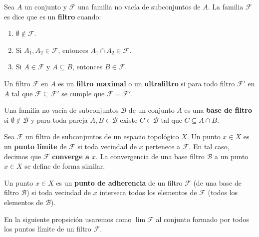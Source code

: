 \documentclass[12pt]{report}
\theoremstyle{largebreak}
\begin{document}
    \begin{mydef}
        Sea $A$ un conjunto y $\mathcal{F}$ una familia no vacía de subconjuntos de $A$. La familia $\mathcal{F}$ es dice que es un \textbf{filtro} cuando:
        \begin{enumerate}
            \item $\emptyset\notin\mathcal{F}$.
            \item Si $A_1,A_2\in\mathcal{F}$, entonces $A_1\cap A_2\in\mathcal{F}$.
            \item Si $A\in\mathcal{F}$ y $A\subseteq B$, entonces $B\in\mathcal{F}$.
        \end{enumerate}
        Un filtro $\mathcal{F}$ en $A$ es un \textbf{filtro maximal} o un \textbf{ultrafiltro} si para todo filtro $\mathcal{F}'$ en $A$ tal que $\mathcal{F}\subseteq\mathcal{F}'$ se cumple que $\mathcal{F}=\mathcal{F}'$.

        Una familia no vacía de subconjuntos $\mathcal{B}$ de un conjunto $A$ es una \textbf{base de filtro} si $\emptyset\notin\mathcal{B}$ y para toda pareja $A,B\in\mathcal{B}$ existe $C\in\mathcal{B}$ tal que $C\subseteq A\cap B$.
    \end{mydef}

    \begin{mydef}
        Sea $\mathcal{F}$ un filtro de subconjuntos de un espacio topológico $X$. Un punto $x\in X$ es un \textbf{punto límite} de $\mathcal{F}$ si toda vecindad de $x$ pertenece a $\mathcal{F}$. En tal caso, decimos que $\mathcal{F}$ \textbf{converge a $x$}. La convergencia de una base filtro $\mathcal{B}$ a un punto $x\in X$ se define de forma similar.

        Un punto $x\in X$ es un \textbf{punto de adherencia} de un filtro $\mathcal{F}$ (de una base de filtro $\mathcal{B}$) si toda vecindad de $x$ interseca todos los elementos de $\mathcal{F}$ (todos los elementos de $\mathcal{B}$).
    \end{mydef}

    En la siguiente propsición usaremos como $\lim\mathcal{F}$ al conjunto formado por todos los puntos límite de un filtro $\mathcal{F}$.
\end{document}
